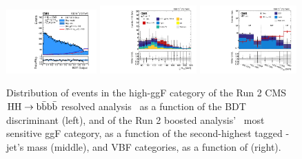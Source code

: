 \begin{figure}[htb!]
    \centering
    \includegraphics[trim=260pt 20pt 40pt 20pt, clip, width=0.31\textwidth]{figures/05-HH/CMS-results/4b/Figure_001-e.png}
    \includegraphics[width=0.33\textwidth]{figures/05-HH/CMS-results/4b/CMS-B2G-22-003_Figure_001.pdf}
    \includegraphics[width=0.33\textwidth]{figures/05-HH/CMS-results/4b/CMS-B2G-22-003_Figure_002.pdf}
    \caption[Distribution of events in the high-\mHH ggF category of the Run 2 CMS $\HH\to\bbbb$ resolved analysis~\cite{CMS:2022cpr}.]{Distribution of events in the high-\mHH ggF category of the Run 2 CMS $\HH\to\bbbb$ resolved analysis~\cite{CMS:2022cpr} as a function of the BDT discriminant (left), and of the Run 2 boosted analysis'~\cite{CMS:2022gjd} most sensitive ggF category, as a function of the second-highest tagged \bbbar-jet's mass (middle), and VBF categories, as a function of \mHH (right).}
    \label{fig:05_bbbb_run2}
\end{figure}

